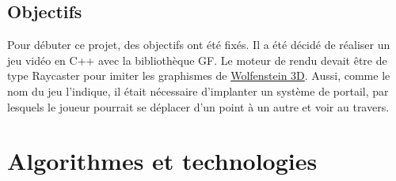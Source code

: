 \documentclass[11pt]{article}
\begin{document}
\subsection{Objectifs}
Pour débuter ce projet, des objectifs ont été fixés.
Il a été décidé de réaliser un jeu vidéo en C++ avec la bibliothèque GF.
Le moteur de rendu devait être de type Raycaster pour imiter les graphismes
de \href{https://fr.wikipedia.org/wiki/Wolfenstein_3D}{Wolfenstein 3D}\cite{Wolfenstein3D}.
Aussi, comme le nom du jeu l'indique, il était nécessaire d'implanter un système de portail,
par lesquels le joueur pourrait se déplacer d'un point à un autre et voir au travers.

\section{Algorithmes et technologies}
\end{document}
